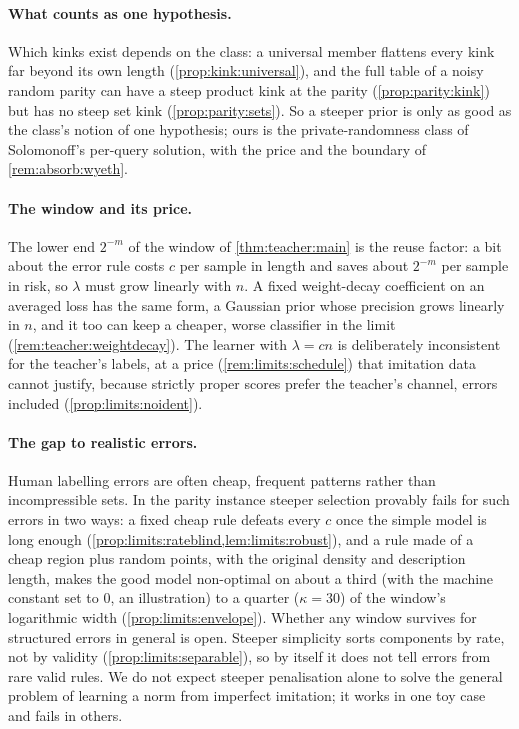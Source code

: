\paragraph{What counts as one hypothesis.} Which kinks exist depends on the class: a universal member flattens every kink far beyond its own length (\cref{prop:kink:universal}), and the full table of a noisy random parity can have a steep product kink at the parity (\cref{prop:parity:kink}) but has no steep set kink (\cref{prop:parity:sets}). So a steeper prior is only as good as the class's notion of one hypothesis; ours is the private-randomness class of Solomonoff's per-query solution, with the price and the boundary of \cref{rem:absorb:wyeth}.

\paragraph{The window and its price.} The lower end $2^{-m}$ of the window of \cref{thm:teacher:main} is the reuse factor: a bit about the error rule costs $c$ per sample in length and saves about $2^{-m}$ per sample in risk, so $\lambda$ must grow linearly with $n$. A fixed weight-decay coefficient on an averaged loss has the same form, a Gaussian prior whose precision grows linearly in $n$, and it too can keep a cheaper, worse classifier in the limit (\cref{rem:teacher:weightdecay}). The learner with $\lambda=cn$ is deliberately inconsistent for the teacher's labels, at a price (\cref{rem:limits:schedule}) that imitation data cannot justify, because strictly proper scores prefer the teacher's channel, errors included (\cref{prop:limits:noident}).

\paragraph{The gap to realistic errors.} Human labelling errors are often cheap, frequent patterns rather than incompressible sets. In the parity instance steeper selection provably fails for such errors in two ways: a fixed cheap rule defeats every $c$ once the simple model is long enough (\cref{prop:limits:rateblind,lem:limits:robust}), and a rule made of a cheap region plus random points, with the original density and description length, makes the good model non-optimal on about a third (with the machine constant set to $0$, an illustration) to a quarter ($\kappa=30$) of the window's logarithmic width (\cref{prop:limits:envelope}). Whether any window survives for structured errors in general is open. Steeper simplicity sorts components by rate, not by validity (\cref{prop:limits:separable}), so by itself it does not tell errors from rare valid rules. We do not expect steeper penalisation alone to solve the general problem of learning a norm from imperfect imitation; it works in one toy case and fails in others.


